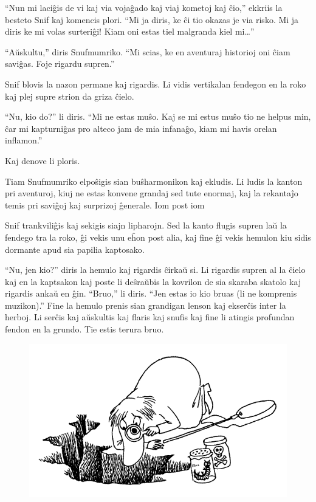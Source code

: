 ``Nun mi laciĝis de vi kaj via vojaĝado kaj viaj kometoj kaj ĉio,'' ekkriis la besteto Snif kaj komencis plori. ``Mi ja diris, ke ĉi tio okazas je via risko. Mi ja diris ke mi volas surteriĝi! Kiam oni estas tiel malgranda kiel mi{\ldots}''

``Aŭskultu,'' diris Snufmumriko. ``Mi scias, ke en aventuraj historioj oni ĉiam saviĝas. Foje rigardu supren.''

Snif blovis la nazon permane kaj rigardis. Li vidis vertikalan fendegon en la roko kaj plej supre strion da griza ĉielo.

``Nu, kio do?'' li diris. ``Mi ne estas muŝo. Kaj se mi estus muŝo tio ne helpus min, ĉar mi kapturniĝas pro alteco jam de mia infanaĝo, kiam mi havis orelan inflamon.''

Kaj denove li ploris.

Tiam Snufmumriko elpoŝigis sian buŝharmonikon kaj ekludis. Li ludis la kanton pri aventuroj, kiuj ne estas konvene grandaj sed tute enormaj, kaj la rekantaĵo temis pri saviĝoj kaj surprizoj ĝenerale. Iom post iom

Snif trankviliĝis kaj sekigis siajn lipharojn. Sed la kanto flugis supren laŭ la fendego tra la roko, ĝi vekis unu eĥon post alia, kaj fine ĝi vekis hemulon kiu sidis dormante apud sia papilia kaptosako.

``Nu, jen kio?'' diris la hemulo kaj rigardis ĉirkaŭ si. Li rigardis supren al la ĉielo kaj en la kaptsakon kaj poste li deŝraŭbis la kovrilon de sia skaraba skatolo kaj rigardis ankaŭ en ĝin. ``Bruo,'' li diris. ``Jen estas io kio bruas (li ne komprenis muzikon).'' Fine la hemulo prenis sian grandigan lenson kaj ekserĉis inter la herboj. Li serĉis kaj aŭskultis kaj flaris kaj snufis kaj fine li atingis profundan fendon en la grundo. Tie estis terura bruo.

\begin{figure}[htbp]
\centering
\includegraphics[width=321pt,height=189pt]{3-11.png}
\caption{}
\label{3-11}
\end{figure}

